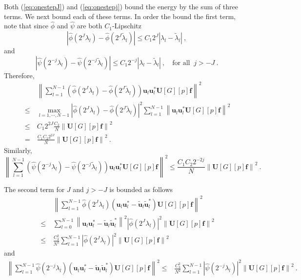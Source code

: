 \documentclass{article}
\def\l{\lambda}
\def\tl{\tilde{\l}}
\def\BU{\boldsymbol{U}}
\def\Bf{\boldsymbol{f}}
\def\Bu{\boldsymbol{u}}
\def\Btu{\tilde{\boldsymbol{u}}}
\newcommand{\abs}[1]{\left| #1 \right|}
\newcommand{\norm}[1]{\left\lVert#1\right\rVert}
\begin{document}
Both (\ref{eq:onestepJ}) and (\ref{eq:onestepj}) bound the energy by the sum of three terms. We next bound each of these terms. In order the bound the first term, note that since $\hat{\phi}$ and $\hat{\psi}$ are both $C_1$-Lipschitz
\begin{equation}
\abs{\hat{\phi}(2^J \l_l)-\hat{\phi}(2^J \tl_l)} \leq C_1 2^J \abs{\l_l - \tl_l} ~,
\end{equation}
and
\begin{equation}
\abs{\hat{\psi}(2^{-j} \l_l)-\hat{\psi}(2^{-j} \tl_l)} \leq C_1 2^{-j} \abs{\l_l - \tl_l} ~, \quad \mbox{for all }~ j > -J ~.
\end{equation}
Therefore,
\begin{equation}\label{eq:firstUsefulBound}
\begin{aligned}
& \norm{\sum_{l=1}^{N-1} \left( \hat{\phi}(2^J \l_l)-\hat{\phi}(2^J \tl_l) \right) \Bu_l \Bu_l^* \BU[G][p]\Bf}^2 \\
~\leq~ & \max_{l = 1, \cdots, N-1} \abs{\hat{\phi}(2^J \l_l) - \hat{\phi}(2^J \tl_l)}^2 \sum_{l=1}^{N-1} \norm{\Bu_l \Bu_l^* \BU[G][p]\Bf}^2 \\
~\leq~ & C_1 2^{2J} \frac{C_2}{N} \norm{\BU[G][p]\Bf}^2 \\
~=~ & \frac{C_1 C_2 2^{2J}}{N} \norm{\BU[G][p]\Bf}^2 ~.
\end{aligned}
\end{equation}
Similarly,
\begin{equation}
\norm{\sum_{l=1}^{N-1} \left( \hat{\psi}(2^{-j} \l_l)-\hat{\psi}(2^{-j} \tl_l) \right) \Bu_l \Bu_l^* \BU[G][p]\Bf}^2 \leq \frac{C_1 C_2 2^{-2j}}{N} \norm{\BU[G][p]\Bf}^2 ~.
\end{equation}


The second term for $J$ and $j > -J$ is bounded as follows
\begin{equation}
\begin{aligned}
& \norm{\sum_{l=1}^{N-1} \hat{\phi}(2^J \l_l) (\Bu_l \Bu_l^* - \Btu_l \Btu_l^*) \BU[G][p]\Bf}^2 \\
~\leq~ & \sum_{l=0}^{N-1} \norm{\Bu_l \Bu_l^* - \Btu_l \Btu_l^*}^2 \abs{\hat{\phi}(2^J \l_l)}^2 \norm{\BU[G][p]\Bf}^2 \\
~\leq~ & \frac{C_3^2}{N^2} \sum_{l=1}^{N-1} \abs{\hat{\phi}(2^J \l_l)}^2 \norm{\BU[G][p]\Bf}^2 
\end{aligned}
\end{equation}
and
\begin{equation}
\begin{aligned}
\norm{\sum_{l=1}^{N-1} \hat{\psi}(2^{-j} \l_l) (\Bu_l \Bu_l^* - \Btu_l \Btu_l^*) \BU[G][p]\Bf}^2
\leq & \frac{C_3^2}{N^2} \sum_{l=1}^{N-1} \abs{\hat{\psi}(2^{-j} \l_l)}^2 \norm{\BU[G][p]\Bf}^2 ~.
\end{aligned}
\end{equation}
\end{document}
